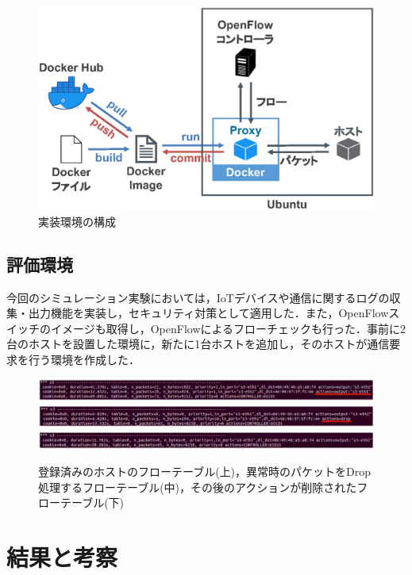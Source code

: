 \documentclass[Japanese]{dicomopapers}
\begin{document}
\begin{figure}[!tb]
	\centering
	\includegraphics[width=\linewidth]{img/program.eps}
	\caption{実装環境の構成}
	\label{fig:program}
\end{figure}

\subsection{評価環境}
今回のシミュレーション実験においては，IoTデバイスや通信に関するログの収集・出力機能を実装し，セキュリティ対策として適用した．また，OpenFlowスイッチのイメージも取得し，OpenFlowによるフローチェックも行った．事前に2台のホストを設置した環境に，新たに1台ホストを追加し，そのホストが通信要求を行う環境を作成した．


\begin{figure}[!tb]
	\centering
	\includegraphics[width=\linewidth]{img/result_flow4v3.eps}
	\includegraphics[width=\linewidth]{img/result_flow2v3.eps}
	\includegraphics[width=\linewidth]{img/result_flow3v2.eps}
	\caption{登録済みのホストのフローテーブル(上)，異常時のパケットをDrop処理するフローテーブル(中)，その後のアクションが削除されたフローテーブル(下)}
	\label{fig:result1}
\end{figure}

\section{結果と考察}
\end{document}
